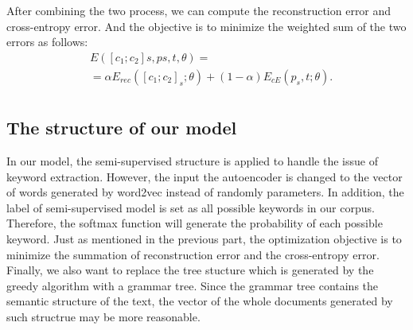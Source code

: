 \documentclass[dvips,9pt]{article}
\begin{document}
After combining the two process, we can compute the reconstruction error and cross-entropy error. And the objective is to minimize the weighted sum of the two errors as follows:
\begin{equation}
\begin{split}
 & E([c_{1}; c_{2}]s, ps, t, θ) = \\
 & = \alpha E_{rec}([c_{1}; c_{2}]_{s}; \theta) + (1 - \alpha)E_{cE}(p_{s}, t; \theta).
\\
 \end{split}
\end{equation}



\subsection{The structure of our model}
In our model, the semi-supervised structure is applied to handle the issue of keyword extraction. However, the input the autoencoder is changed to the vector of words generated by word2vec instead of randomly parameters. In addition, the label of semi-supervised model is set as all possible keywords in our corpus. Therefore, the softmax function will generate the probability of each possible keyword. Just as mentioned in the previous part, the optimization objective is to minimize the summation of reconstruction error and the cross-entropy error. Finally, we also want to replace the tree stucture which is generated by the greedy algorithm with a grammar tree. Since the grammar tree contains the semantic structure of the text, the vector of the whole documents generated by such structrue may be more reasonable.
\end{document}
